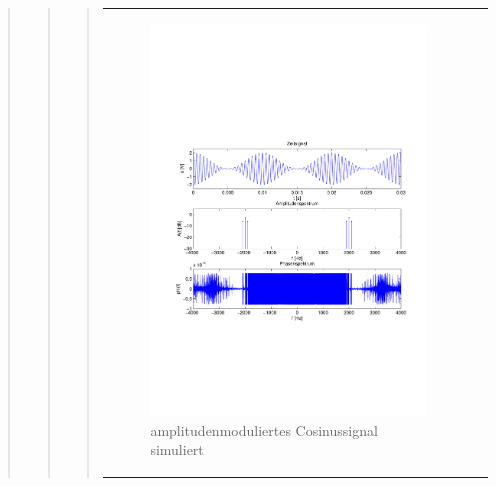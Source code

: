\begin{quote}
\begin{quote}
\begin{quote}
            \begin{center}
                \begin{tabular}{ll}
    
                \hspace{-10em}
                    \begin{minipage}{0.6\textwidth}
    
                        \begin{figure}[H]
                            \label{fig:}
                            \includegraphics[scale=0.4, trim = 2cm 6.5cm 1.5cm
                            8.5cm, clip]{./Bilder/Cosinusmodsimuliert} %
                            \caption{amplitudenmoduliertes Cosinussignal simuliert}
                        \end{figure}
    

\end{minipage}
\end{tabular}
\end{center}
\end{quote}
\end{quote}
\end{quote}
